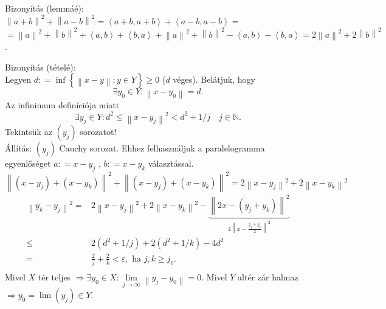 \documentclass[12pt,a4paper]{scrartcl}
\newenvironment{bizonyitas}{}{}
\begin{document}
\begin{bizonyitas}

Bizonyítás (lemmáé):\\
\(\left\| {a + b} \right\|^{2} + \left\| {a - b} \right\|^{2} = \left\langle {a + b,a + b} \right\rangle + \left\langle {a - b,a - b} \right\rangle =\)
\(= \left\| a \right\|^{2} + \left\| b \right\|^{2} + \left\langle {a,b} \right\rangle + \left\langle {b,a} \right\rangle + \left\| a \right\|^{2} + \left\| b \right\|^{2} - \left\langle {a,b} \right\rangle - \left\langle {b,a} \right\rangle = 2\left\| a \right\|^{2} + 2\left\| b \right\|^{2}\).

\end{bizonyitas}

\begin{bizonyitas}

Bizonyítás (tételé):\\
Legyen
\(d: = \inf\left\{ {\left\| {x - y} \right\|:y \in Y} \right\} \geq 0\)
(\(d\) véges). Belátjuk, hogy
\[\exists y_{0} \in Y:\left\| {x - y_{0}} \right\| = d.\] Az infinimum
definíciója miatt
\[\exists y_{j} \in Y:d^{2} \leq \left\| {x - y_{j}} \right\|^{2} < d^{2} + 1/j\quad j \in {\mathbb{N}}.\]Tekintsük
az \(\left( y_{j} \right)\) sorozatot!\\
Állítás: \(\left( y_{j} \right)\) Cauchy sorozat. Ehhez felhasználjuk a
paralelogramma egyenlőséget \(a: = x - y_{j}\) , \(b: = x - y_{k}\)
választással.
\[\left\| {\left( {x - y_{j}} \right) + \left( {x - y_{k}} \right)} \right\|^{2} + \left\| {\left( {x - y_{j}} \right) + \left( {x - y_{k}} \right)} \right\|^{2} = 2\left\| {x - y_{j}} \right\|^{2} + 2\left\| {x - y_{k}} \right\|^{2}\]
\[\begin{aligned}
  {\left\| {{y_k} - {y_j}} \right\|^2} =  & 2{\left\| {x - {y_j}} \right\|^2} + 2{\left\| {x - {y_k}} \right\|^2} - \underbrace {{{\left\| {2x - \left( {{y_j} + {y_k}} \right)} \right\|}^2}}_{4{{\left\| {x - \frac{{{y_j} + {y_k}}}{2}} \right\|}^2}} \\ 
   \leqslant  & 2\left( {{d^2} + 1/j} \right) + 2\left( {{d^2} + 1/k} \right) - 4{d^2} \\ 
   =  & \frac{2}{j} + \frac{2}{k} < \varepsilon , \text{ ha } j,k \geqslant {j_0}. \\ 
\end{aligned} \] Mivel \(X\) tér teljes
\(\left. \Rightarrow\exists y_{0} \in X:\lim\limits_{j\rightarrow\infty}\left\| {y_{j} - y_{0}} \right\| = 0 \right.\).
Mivel \(Y\) altér zár halmaz
\(\left. \Rightarrow y_{0} = \lim\left( y_{j} \right) \in Y \right.\).


\end{bizonyitas}
\end{document}
